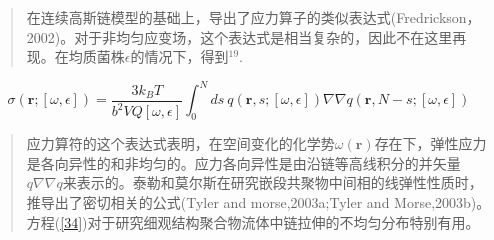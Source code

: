 \begin{quotation}
在连续高斯链模型的基础上，导出了应力算子的类似表达式(Fredrickson，2002)。对于非均匀应变场，这个表达式是相当复杂的，因此不在这里再现。在均质菌株$\epsilon$的情况下，得到$^{19}$.
\end{quotation}
\begin{equation}\label{34}
\sigma(\mathbf{r};[\omega,\epsilon])=\frac{3k_BT}{b^2VQ[\omega,\epsilon]}\int_{0}^{N} ds~q(\mathbf{r},s;[\omega,\epsilon])\nabla \nabla q(\mathbf{r},N-s;[\omega,\epsilon])
\end{equation}
\begin{quotation}
应力算符的这个表达式表明，在空间变化的化学势$\omega(\mathbf{r})$存在下，弹性应力是各向异性的和非均匀的。应力各向异性是由沿链等高线积分的并矢量$q\nabla \nabla q$来表示的。泰勒和莫尔斯在研究嵌段共聚物中间相的线弹性性质时，推导出了密切相关的公式(Tyler and morse,2003a;Tyler and Morse,2003b)。方程(\ref{34})对于研究细观结构聚合物流体中链拉伸的不均匀分布特别有用。
\end{quotation}
